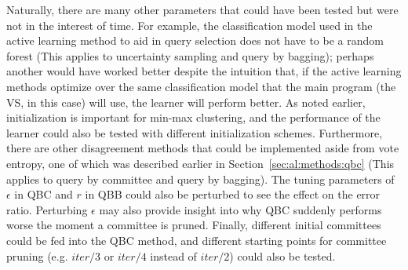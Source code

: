 Naturally, there are many other parameters that could have been tested but were 
not in the interest of time. For 
example, the classification model used in the active learning method to aid in 
query selection does not have to be a random forest 
(This applies to uncertainty sampling and query by bagging); perhaps another 
would have worked better despite 
the intuition that, if the active learning methods optimize over the same 
classification model that the main program (the VS, in this case) will use, the 
learner will perform better. As noted earlier, initialization is important for 
min-max clustering, and the performance of the learner could also be tested 
with different initialization 
schemes. Furthermore, there are other disagreement methods 
that could be implemented aside from vote entropy, one of which was described 
earlier in Section~\ref{sec:al:methods:qbc} (This applies to query by committee 
and query by bagging). The tuning parameters of $\epsilon$ in QBC and $r$ in 
QBB could also be perturbed to see the effect on the error ratio. Perturbing 
$\epsilon$ may also provide insight into why QBC suddenly performs worse the 
moment a committee is pruned. Finally, 
different initial committees could be fed into the QBC method, and different 
starting points for committee pruning (e.g. $iter/3$ or $iter/4$ instead of 
$iter/2$) could also 
be tested.